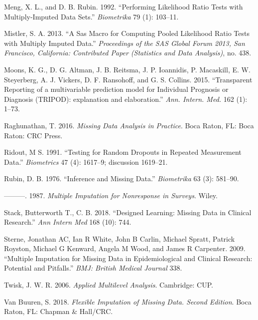 \documentclass[
]{book}
\begin{document}
\leavevmode\hypertarget{ref-Meng1992}{}%
Meng, X. L., and D. B. Rubin. 1992. ``Performing Likelihood Ratio Tests
with Multiply-Imputed Data Sets.'' \emph{Biometrika} 79 (1): 103--11.

\leavevmode\hypertarget{ref-Mistler2013}{}%
Mistler, S. A. 2013. ``A Sas Macro for Computing Pooled Likelihood Ratio
Tests with Multiply Imputed Data.'' \emph{Proceedings of the SAS Global
Forum 2013, San Francisco, California: Contributed Paper (Statistics and
Data Analysis)}, no. 438.

\leavevmode\hypertarget{ref-Moons2015}{}%
Moons, K. G., D. G. Altman, J. B. Reitsma, J. P. Ioannidis, P.
Macaskill, E. W. Steyerberg, A. J. Vickers, D. F. Ransohoff, and G. S.
Collins. 2015. ``Transparent Reporting of a multivariable prediction
model for Individual Prognosis or Diagnosis (TRIPOD): explanation and
elaboration.'' \emph{Ann. Intern. Med.} 162 (1): 1--73.

\leavevmode\hypertarget{ref-raghunathan2016}{}%
Raghunathan, T. 2016. \emph{Missing Data Analysis in Practice}. Boca
Raton, FL: Boca Raton: CRC Press.

\leavevmode\hypertarget{ref-Ridout1991}{}%
Ridout, M S. 1991. ``Testing for Random Dropouts in Repeated Measurement
Data.'' \emph{Biometrics} 47 (4): 1617--9; discussion 1619--21.

\leavevmode\hypertarget{ref-Rubin1976}{}%
Rubin, D. B. 1976. ``Inference and Missing Data.'' \emph{Biometrika} 63
(3): 581--90.

\leavevmode\hypertarget{ref-Rubin1987}{}%
---------. 1987. \emph{Multiple Imputation for Nonresponse in Surveys}.
Wiley.

\leavevmode\hypertarget{ref-Stack2018}{}%
Stack, Butterworth T., C. B. 2018. ``Designed Learning: Missing Data in
Clinical Research.'' \emph{Ann Intern Med} 168 (10): 744.

\leavevmode\hypertarget{ref-sterne2009multiple}{}%
Sterne, Jonathan AC, Ian R White, John B Carlin, Michael Spratt, Patrick
Royston, Michael G Kenward, Angela M Wood, and James R Carpenter. 2009.
``Multiple Imputation for Missing Data in Epidemiological and Clinical
Research: Potential and Pitfalls.'' \emph{BMJ: British Medical Journal}
338.

\leavevmode\hypertarget{ref-twisk2006appliedmultilevelanalysis}{}%
Twisk, J. W. R. 2006. \emph{Applied Multilevel Analysis}. Cambridge:
CUP.

\leavevmode\hypertarget{ref-VanBuuren2018}{}%
Van Buuren, S. 2018. \emph{Flexible Imputation of Missing Data. Second
Edition}. Boca Raton, FL: Chapman \& Hall/CRC.
\end{document}
